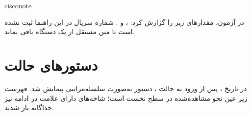 \documentclass[11pt,letterpaper]{report}
\newenvironment{notebox}[1]{%
	\begin{noticebox}[title={\textbf{\faInfoCircle\ #1}}]{cisconote}
	}{%
	\end{noticebox}
}
\begin{document}
	\begin{notebox}{نمونه خروجی شناسایی}
		در آزمون،  مقدارهای زیر را گزارش کرد:
		،  و
		. شماره سریال در این راهنما
		ثبت نشده است تا متن مستقل از یک دستگاه باقی بماند.
	\end{notebox}

	\section{دستورهای حالت }

	در تاریخ ، پس از ورود به حالت
	، دستور  به‌صورت سلسله‌مراتبی پیمایش شد.
	فهرست زیر عین نحو مشاهده‌شده در سطح نخست است؛ شاخه‌های دارای علامت
	 در ادامه نیز جداگانه باز شدند.
\end{document}
